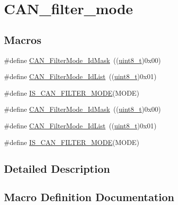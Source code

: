 \hypertarget{group___c_a_n__filter__mode}{}\section{C\+A\+N\+\_\+filter\+\_\+mode}
\label{group___c_a_n__filter__mode}
\subsection*{Macros}
\begin{DoxyCompactItemize}
\item 
\#define \hyperlink{group___c_a_n__filter__mode_ga8136e518fb31fd91079e4c7c4c19c94b}{C\+A\+N\+\_\+\+Filter\+Mode\+\_\+\+Id\+Mask}~((\hyperlink{_p_e___types_8h_aba7bc1797add20fe3efdf37ced1182c5}{uint8\+\_\+t})0x00)
\item 
\#define \hyperlink{group___c_a_n__filter__mode_ga91e9144f71b15ac345ee89314711c158}{C\+A\+N\+\_\+\+Filter\+Mode\+\_\+\+Id\+List}~((\hyperlink{_p_e___types_8h_aba7bc1797add20fe3efdf37ced1182c5}{uint8\+\_\+t})0x01)
\item 
\#define \hyperlink{group___c_a_n__filter__mode_gae684565d5392c12fd333379e5ec840f8}{I\+S\+\_\+\+C\+A\+N\+\_\+\+F\+I\+L\+T\+E\+R\+\_\+\+M\+O\+DE}(M\+O\+DE)
\item 
\#define \hyperlink{group___c_a_n__filter__mode_ga8136e518fb31fd91079e4c7c4c19c94b}{C\+A\+N\+\_\+\+Filter\+Mode\+\_\+\+Id\+Mask}~((\hyperlink{_p_e___types_8h_aba7bc1797add20fe3efdf37ced1182c5}{uint8\+\_\+t})0x00)
\item 
\#define \hyperlink{group___c_a_n__filter__mode_ga91e9144f71b15ac345ee89314711c158}{C\+A\+N\+\_\+\+Filter\+Mode\+\_\+\+Id\+List}~((\hyperlink{_p_e___types_8h_aba7bc1797add20fe3efdf37ced1182c5}{uint8\+\_\+t})0x01)
\item 
\#define \hyperlink{group___c_a_n__filter__mode_gae684565d5392c12fd333379e5ec840f8}{I\+S\+\_\+\+C\+A\+N\+\_\+\+F\+I\+L\+T\+E\+R\+\_\+\+M\+O\+DE}(M\+O\+DE)
\end{DoxyCompactItemize}


\subsection{Detailed Description}


\subsection{Macro Definition Documentation}
